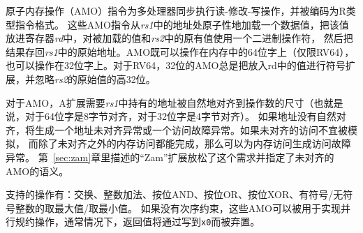 \vspace{-0.1in} 原子内存操作（AMO）指令为多处理器同步执行读-修改-写操作，并被编码为R类型指令格式。
这些AMO指令从{\em rs1}中的地址处原子性地加载一个数据值，把该值放进寄存器{\em rd}中，对被加载的值和{\em rs2}中的原有值使用一个二进制操作符，
然后把结果存回{\em rs1}中的原始地址。AMO既可以操作在内存中的64位字上（仅限RV64），
也可以操作在32位字上。对于RV64，32位的AMO总是把放入rd中的值进行符号扩展，并忽略{\em rs2}的原始值的高32位。

对于AMO，A扩展需要{\em rs1}中持有的地址被自然地对齐到操作数的尺寸（也就是说，对于64位字是8字节对齐，对于32位字是4字节对齐）。
如果地址没有自然对齐，将生成一个地址未对齐异常或一个访问故障异常。如果未对齐的访问不宜被模拟，
而除了未对齐之外的内存访问都能完成，那么可以为内存访问生成访问故障异常。
第~\ref{sec:zam}章里描述的“Zam”扩展放松了这个需求并指定了未对齐的AMO的语义。

支持的操作有：交换、整数加法、按位AND、按位OR、按位XOR、有符号/无符号整数的取最大值/取最小值。
如果没有次序约束，这些AMO可以被用于实现并行规约操作，通常情况下，返回值将通过写到{\tt x0}而被弃置。

